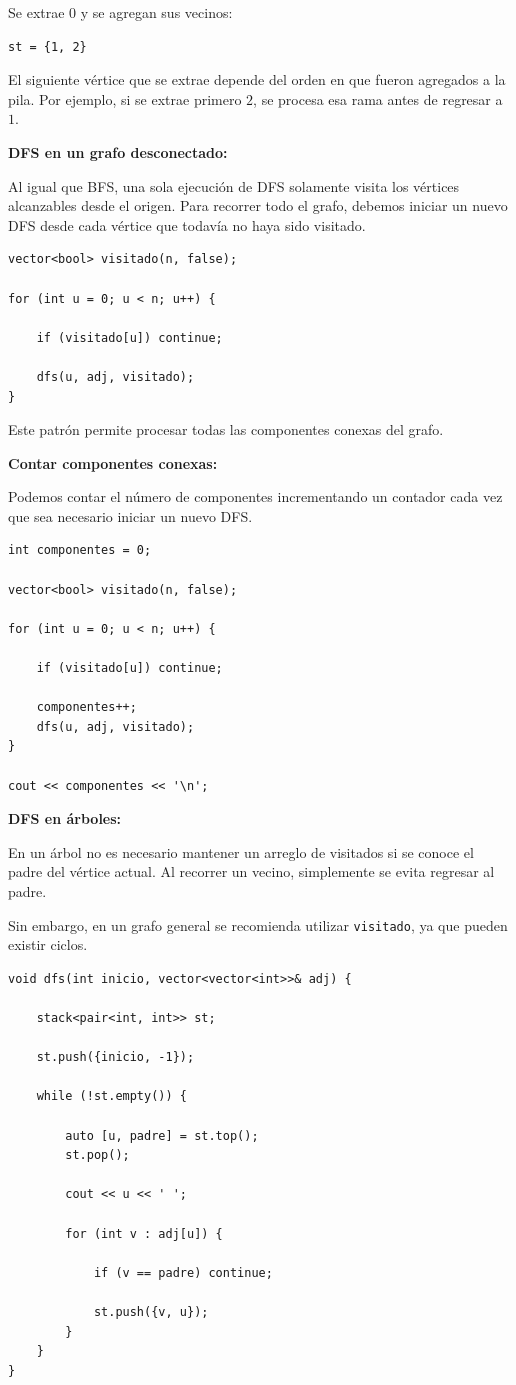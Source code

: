 \documentclass[10pt,a4paper,twocolumn]{article}
\begin{document}
Se extrae $0$ y se agregan sus vecinos:

\begin{lstlisting}[style=cpp]
st = {1, 2}
\end{lstlisting}

El siguiente vértice que se extrae depende del orden en que fueron
agregados a la pila. Por ejemplo, si se extrae primero $2$, se procesa
esa rama antes de regresar a $1$.

\textbf{DFS en un grafo desconectado:}

Al igual que BFS, una sola ejecución de DFS solamente visita los
vértices alcanzables desde el origen. Para recorrer todo el grafo,
debemos iniciar un nuevo DFS desde cada vértice que todavía no haya
sido visitado.

\begin{lstlisting}[style=cpp]
vector<bool> visitado(n, false);

for (int u = 0; u < n; u++) {

    if (visitado[u]) continue;

    dfs(u, adj, visitado);
}
\end{lstlisting}

Este patrón permite procesar todas las componentes conexas del grafo.

\textbf{Contar componentes conexas:}

Podemos contar el número de componentes incrementando un contador cada
vez que sea necesario iniciar un nuevo DFS.

\begin{lstlisting}[style=cpp]
int componentes = 0;

vector<bool> visitado(n, false);

for (int u = 0; u < n; u++) {

    if (visitado[u]) continue;

    componentes++;
    dfs(u, adj, visitado);
}

cout << componentes << '\n';
\end{lstlisting}

\textbf{DFS en árboles:}

En un árbol no es necesario mantener un arreglo de visitados si se
conoce el padre del vértice actual. Al recorrer un vecino, simplemente
se evita regresar al padre.

Sin embargo, en un grafo general se recomienda utilizar
\texttt{visitado}, ya que pueden existir ciclos.

\begin{lstlisting}[style=cpp]
void dfs(int inicio, vector<vector<int>>& adj) {

    stack<pair<int, int>> st;

    st.push({inicio, -1});

    while (!st.empty()) {

        auto [u, padre] = st.top();
        st.pop();

        cout << u << ' ';

        for (int v : adj[u]) {

            if (v == padre) continue;

            st.push({v, u});
        }
    }
}
\end{lstlisting}
\end{document}
